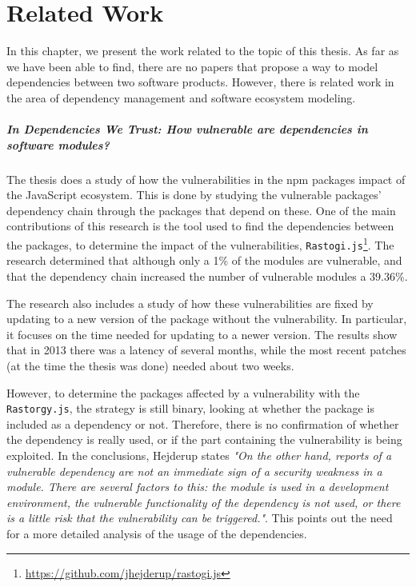 \chapter{Related Work}\label{ch:RelatedWork}
In this chapter, we present the work related to the topic of this thesis.
As far as we have been able to find, there are no papers that propose a way to model dependencies between two software products. However, there is related work in the area of dependency management and software ecosystem modeling.

\paragraph{In Dependencies We Trust: How vulnerable are dependencies in software modules? \cite{hejderup2015dependencies}}
The thesis does a study of how the vulnerabilities in the npm packages impact of the JavaScript ecosystem. This is done by studying the vulnerable packages' dependency chain through the packages that depend on these. One of the main contributions of this research is the tool used to find the dependencies between the packages, to determine the impact of the vulnerabilities, \texttt{Rastogi.js}\footnote{\href{https://github.com/jhejderup/rastogi.js}{https://github.com/jhejderup/rastogi.js}}. The research determined that although only a 1\% of the modules are vulnerable, and that the dependency chain increased the number of vulnerable modules a 39.36\%.

The research also includes a study of how these vulnerabilities are fixed by updating to a new version of the package without the vulnerability. In particular, it focuses on the time needed for updating to a newer version. The results show that in 2013 there was a latency of several months, while the most recent patches (at the time the thesis was done) needed about two weeks.

However, to determine the packages affected by a vulnerability with the \texttt{Rastorgy.js}, the strategy is still binary, looking at whether the package is included as a dependency or not. Therefore, there is no confirmation of whether the dependency is really used, or if the part containing the vulnerability is being exploited. In the conclusions, Hejderup states \textit{"On the other hand, reports of a vulnerable dependency are not an immediate sign of a security weakness in a module. There are several factors to this: the module is used in a development environment, the vulnerable functionality of the dependency is not used, or there is a little risk that the vulnerability can be triggered."}. This points out the need for a more detailed analysis of the usage of the dependencies.

